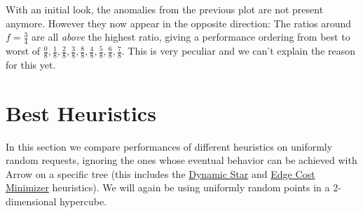 \documentclass[a4paper, oneside]{discothesis}
\begin{document}

With an initial look, the anomalies from the previous plot are not present anymore. However they now appear in the opposite direction: The ratios around $f=\frac{3}{4}$ are all \textit{above} the highest ratio, giving a performance ordering from best to worst of $\frac{0}{8}, \frac{1}{8}, \frac{2}{8}, \frac{3}{8}, \frac{8}{8}, \frac{4}{8}, \frac{5}{8}, \frac{6}{8}, \frac{7}{8}$. This is very peculiar and we can't explain the reason for this yet.

\section{Best Heuristics}\label{result:algs}

In this section we compare performances of different heuristics on uniformly random requests, ignoring the ones whose eventual behavior can be achieved with Arrow on a specific tree (this includes the \hyperref[alg:dynstar]{Dynamic Star} and \hyperref[alg:ecm]{Edge Cost Minimizer} heuristics). We will again be using uniformly random points in a 2-dimensional hypercube.
\end{document}

